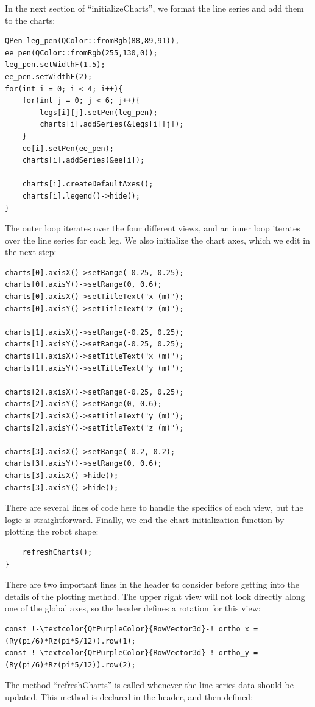 \documentclass[12pt]{article}
\begin{document}
\newpage \noindent
In the next section of ``initializeCharts'', we format the line series and add them to the charts:
\begin{lstlisting}
QPen leg_pen(QColor::fromRgb(88,89,91)), ee_pen(QColor::fromRgb(255,130,0));
leg_pen.setWidthF(1.5);
ee_pen.setWidthF(2);
for(int i = 0; i < 4; i++){
    for(int j = 0; j < 6; j++){
        legs[i][j].setPen(leg_pen);
        charts[i].addSeries(&legs[i][j]);
    }
    ee[i].setPen(ee_pen);
    charts[i].addSeries(&ee[i]);

    charts[i].createDefaultAxes();
    charts[i].legend()->hide();
}
\end{lstlisting}
The outer loop iterates over the four different views, and an inner loop iterates over the line series for each leg. We also initialize the chart axes, which we edit in the next step:
\begin{lstlisting}
charts[0].axisX()->setRange(-0.25, 0.25);
charts[0].axisY()->setRange(0, 0.6);
charts[0].axisX()->setTitleText("x (m)");
charts[0].axisY()->setTitleText("z (m)");

charts[1].axisX()->setRange(-0.25, 0.25);
charts[1].axisY()->setRange(-0.25, 0.25);
charts[1].axisX()->setTitleText("x (m)");
charts[1].axisY()->setTitleText("y (m)");

charts[2].axisX()->setRange(-0.25, 0.25);
charts[2].axisY()->setRange(0, 0.6);
charts[2].axisX()->setTitleText("y (m)");
charts[2].axisY()->setTitleText("z (m)");

charts[3].axisX()->setRange(-0.2, 0.2);
charts[3].axisY()->setRange(0, 0.6);
charts[3].axisX()->hide();
charts[3].axisY()->hide();
\end{lstlisting}
There are several lines of code here to handle the specifics of each view, but the logic is straightforward. Finally, we end the chart initialization function by plotting the robot shape:
\begin{lstlisting}
    refreshCharts();
}
\end{lstlisting}
There are two important lines in the header to consider before getting into the details of the plotting method. The upper right view will not look directly along one of the global axes, so the header defines a rotation for this view:
\begin{lstlisting}
const !-\textcolor{QtPurpleColor}{RowVector3d}-! ortho_x = (Ry(pi/6)*Rz(pi*5/12)).row(1);
const !-\textcolor{QtPurpleColor}{RowVector3d}-! ortho_y = (Ry(pi/6)*Rz(pi*5/12)).row(2);
\end{lstlisting}
\newpage \noindent
The method ``refreshCharts'' is called whenever the line series data should be updated. This method is declared in the header, and then defined:
\end{document}
